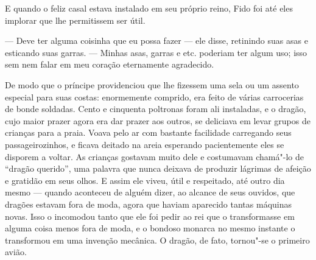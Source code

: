 E quando o feliz casal estava instalado em seu próprio reino, Fido foi
até eles implorar que lhe permitissem ser útil.

--- Deve ter alguma coisinha que eu possa fazer --- ele disse, retinindo
suas asas e esticando suas garras. --- Minhas asas, garras e etc.
poderiam ter algum uso; isso sem nem falar em meu coração eternamente
agradecido.

De modo que o príncipe providenciou que lhe fizessem uma sela ou um
assento especial para suas costas: enormemente comprido, era feito de
várias carrocerias de bonde soldadas. Cento e cinquenta poltronas foram ali
instaladas, e o dragão, cujo maior prazer agora era dar prazer aos
outros, se deliciava em levar grupos de crianças para a praia. Voava
pelo ar com bastante facilidade carregando seus passageirozinhos,
e ficava deitado na areia esperando pacientemente eles se disporem a
voltar. As crianças gostavam muito dele e costumavam chamá"-lo de
“dragão querido”, uma palavra que nunca deixava de produzir lágrimas
de afeição e gratidão em seus olhos. E assim ele viveu, útil e
respeitado, até outro dia mesmo --- quando aconteceu de alguém dizer,
ao alcance de seus ouvidos, que dragões estavam fora de moda, agora
que haviam aparecido tantas máquinas novas. Isso o incomodou tanto
que ele foi pedir ao rei que o transformasse em alguma coisa menos
fora de moda, e o bondoso monarca no mesmo instante o transformou
em uma invenção mecânica. O dragão, de fato, tornou"-se o primeiro
avião.

